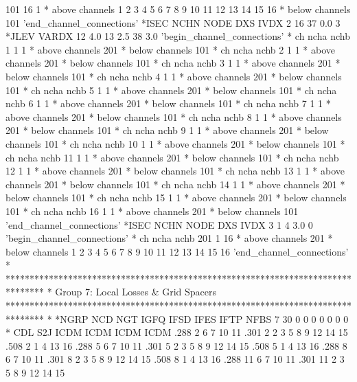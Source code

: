   101   16    1
* above channels
    1    2    3    4    5    6    7    8    9   10
   11   12   13   14   15   16
* below channels
  101
'end_channel_connections'
*ISEC NCHN NODE       DXS IVDX
    2   16   37       0.0    3
*JLEV     VARDX 
   12       4.0   13       2.5   38       3.0
'begin_channel_connections'
*  ch ncha nchb
    1    1    1
* above channels
  201
* below channels
  101
*  ch ncha nchb
    2    1    1
* above channels
  201
* below channels
  101
*  ch ncha nchb
    3    1    1
* above channels
  201
* below channels
  101
*  ch ncha nchb
    4    1    1
* above channels
  201
* below channels
  101
*  ch ncha nchb
    5    1    1
* above channels
  201
* below channels
  101
*  ch ncha nchb
    6    1    1
* above channels
  201
* below channels
  101
*  ch ncha nchb
    7    1    1
* above channels
  201
* below channels
  101
*  ch ncha nchb
    8    1    1
* above channels
  201
* below channels
  101
*  ch ncha nchb
    9    1    1
* above channels
  201
* below channels
  101
*  ch ncha nchb
   10    1    1
* above channels
  201
* below channels
  101
*  ch ncha nchb
   11    1    1
* above channels
  201
* below channels
  101
*  ch ncha nchb
   12    1    1
* above channels
  201
* below channels
  101
*  ch ncha nchb
   13    1    1
* above channels
  201
* below channels
  101
*  ch ncha nchb
   14    1    1
* above channels
  201
* below channels
  101
*  ch ncha nchb
   15    1    1
* above channels
  201
* below channels
  101
*  ch ncha nchb
   16    1    1
* above channels
  201
* below channels
  101
'end_channel_connections'
*ISEC NCHN NODE       DXS IVDX
    3    1    4       3.0    0
'begin_channel_connections'
*  ch ncha nchb
  201    1   16
* above channels
  201
* below channels
    1    2    3    4    5    6    7    8    9   10
   11   12   13   14   15   16
'end_channel_connections'
*
********************************************************************************
* Group 7: Local Losses & Grid Spacers
********************************************************************************
*
*NGRP  NCD  NGT IGFQ IFSD IFES IFTP      NFBS
    7   30    0    0    0    0    0    0    0
* CDL  S2J ICDM ICDM ICDM ICDM
 .288    2    6    7   10   11
 .301    2    2    3    5    8    9   12   14   15
 .508    2    1    4   13   16
 .288    5    6    7   10   11
 .301    5    2    3    5    8    9   12   14   15
 .508    5    1    4   13   16
 .288    8    6    7   10   11
 .301    8    2    3    5    8    9   12   14   15
 .508    8    1    4   13   16
 .288   11    6    7   10   11
 .301   11    2    3    5    8    9   12   14   15
